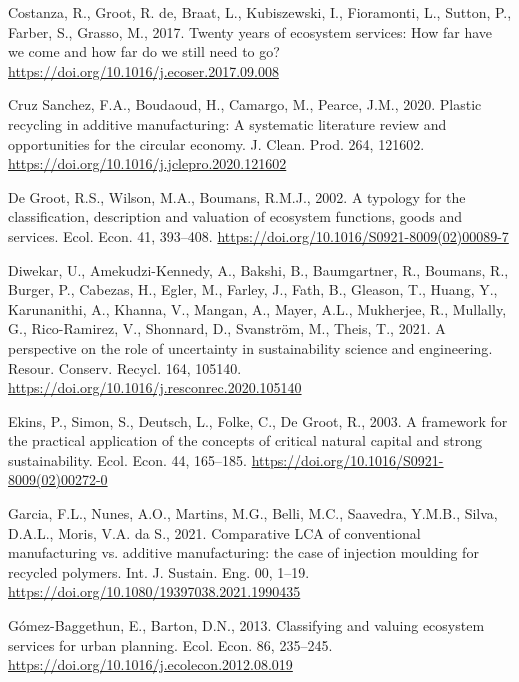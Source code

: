 \documentclass[]{elsarticle} %
\newlength{\cslhangindent}
\newenvironment{CSLReferences}[2] %
 {%
  \setlength{\parindent}{0pt}
  \ifodd #1 \everypar{\setlength{\hangindent}{\cslhangindent}}\ignorespaces\fi
  \ifnum #2 > 0
  \setlength{\parskip}{#2\baselineskip}
  \fi
 }%
 {}
\begin{document}
\begin{CSLReferences}{1}{0}
\leavevmode{}%
Costanza, R., Groot, R. de, Braat, L., Kubiszewski, I., Fioramonti, L., Sutton, P., Farber, S., Grasso, M., 2017. {Twenty years of ecosystem services: How far have we come and how far do we still need to go?} \url{https://doi.org/10.1016/j.ecoser.2017.09.008}

\leavevmode{}%
Cruz Sanchez, F.A., Boudaoud, H., Camargo, M., Pearce, J.M., 2020. {Plastic recycling in additive manufacturing: A systematic literature review and opportunities for the circular economy}. J. Clean. Prod. 264, 121602. \url{https://doi.org/10.1016/j.jclepro.2020.121602}

\leavevmode{}%
De Groot, R.S., Wilson, M.A., Boumans, R.M.J., 2002. {A typology for the classification, description and valuation of ecosystem functions, goods and services}. Ecol. Econ. 41, 393--408. \url{https://doi.org/10.1016/S0921-8009(02)00089-7}

\leavevmode{}%
Diwekar, U., Amekudzi-Kennedy, A., Bakshi, B., Baumgartner, R., Boumans, R., Burger, P., Cabezas, H., Egler, M., Farley, J., Fath, B., Gleason, T., Huang, Y., Karunanithi, A., Khanna, V., Mangan, A., Mayer, A.L., Mukherjee, R., Mullally, G., Rico-Ramirez, V., Shonnard, D., Svanström, M., Theis, T., 2021. {A perspective on the role of uncertainty in sustainability science and engineering}. Resour. Conserv. Recycl. 164, 105140. \url{https://doi.org/10.1016/j.resconrec.2020.105140}

\leavevmode{}%
Ekins, P., Simon, S., Deutsch, L., Folke, C., De Groot, R., 2003. {A framework for the practical application of the concepts of critical natural capital and strong sustainability}. Ecol. Econ. 44, 165--185. \url{https://doi.org/10.1016/S0921-8009(02)00272-0}

\leavevmode{}%
Garcia, F.L., Nunes, A.O., Martins, M.G., Belli, M.C., Saavedra, Y.M.B., Silva, D.A.L., Moris, V.A. da S., 2021. {Comparative LCA of conventional manufacturing vs. additive manufacturing: the case of injection moulding for recycled polymers}. Int. J. Sustain. Eng. 00, 1--19. \url{https://doi.org/10.1080/19397038.2021.1990435}

\leavevmode{}%
Gómez-Baggethun, E., Barton, D.N., 2013. {Classifying and valuing ecosystem services for urban planning}. Ecol. Econ. 86, 235--245. \url{https://doi.org/10.1016/j.ecolecon.2012.08.019}


\end{CSLReferences}
\end{document}

